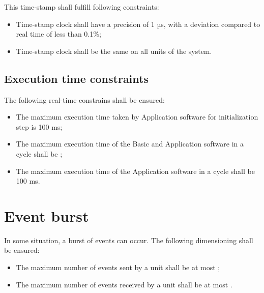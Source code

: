 This time-stamp shall fulfill
following constraints:
\begin{itemize}
\item Time-stamp clock shall have a precision of 1 µs, with a
  deviation compared to real time of less than 0.1\%;
\item Time-stamp clock shall be the same on all units of the system.
\end{itemize}

\subsection{Execution time constraints}

The following real-time constrains shall be ensured:
\begin{itemize}
\item The maximum execution time taken by Application software for
  initialization step is 100 ms;
\item The maximum execution time of the Basic and Application software
  in a cycle shall be ;
\item The maximum execution time of the Application software in a
  cycle shall be 100 ms.
\end{itemize}

\section{Event burst}

In some situation, a burst of events can occur. The following
dimensioning shall be ensured:
\begin{itemize}
\item The maximum number of events sent by a unit shall be at most
  ;
\item The maximum number of events received by a unit shall be at most
  .
\end{itemize}



